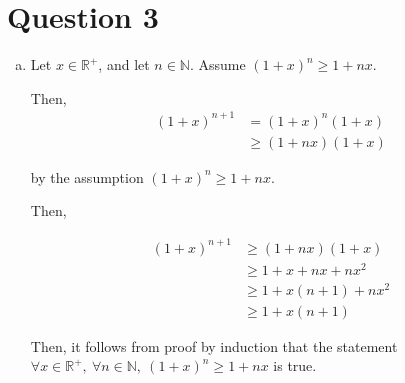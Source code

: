 \documentclass[12pt]{article}
\begin{document}
\section*{Question 3}
\begin{enumerate}[a.]
    \item

    Let $x \in \mathbb{R}^{+}$, and let $n \in \mathbb{N}$. Assume $(1+x)^n \geq
    1 + nx$.

    \bigskip

    Then,
    \setcounter{equation}{0}
    \begin{align}
        (1+x)^{n+1} &= (1+x)^n(1+x)\\
        &\geq (1+nx)(1+x)
    \end{align}

    by the assumption $(1+x)^n \geq 1 + nx$.

    \bigskip

    Then,

    \begin{align}
        (1+x)^{n+1} &\geq (1+nx)(1+x)\\
        &\geq 1 + x + nx + nx^2\\
        &\geq 1 + x(n+1) + nx^2\\
        &\geq 1 + x(n+1)
    \end{align}

    Then, it follows from proof by induction that the statement $\forall x \in
    \mathbb{R}^{+},\:\forall n \in \mathbb{N},\:(1+x)^n \geq 1 + nx$ is true.

\end{enumerate}
\end{document}
